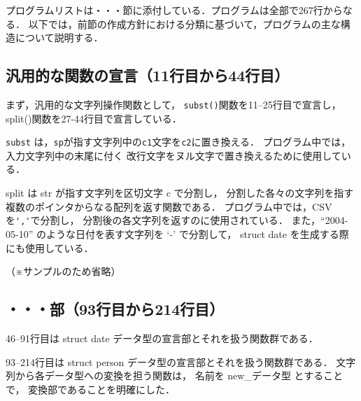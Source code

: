 \documentclass[a4j,11pt]{jarticle}
\begin{document}


プログラムリストは・・・節に添付している．プログラムは全部で267行からなる．
以下では，前節の作成方針における分類に基づいて，プログラムの主な構造について説明する．

\subsection{汎用的な関数の宣言（11行目から44行目）}

まず，汎用的な文字列操作関数として，
\verb|subst()|関数を11--25行目で宣言し， %
split()関数を27-44行目で宣言している．       %

\verb|subst| は，\verb|sp|が指す文字列中の\verb|c1|文字を\verb|c2|に置き換える．
プログラム中では，入力文字列中の末尾に付く
改行文字をヌル文字で置き換えるために使用している．

split は str が指す文字列を区切文字 c で分割し，
分割した各々の文字列を指す複数のポインタからなる配列を返す関数である．
プログラム中では，CSVを\verb|','|で分割し，
分割後の各文字列を返すのに使用されている．
また，``2004-05-10'' のような日付を表す文字列を `-' で分割して，
struct date を生成する際にも使用している．

（※サンプルのため省略）

\subsection{・・・部（93行目から214行目）}

46--91行目は struct date データ型の宣言部とそれを扱う関数群である．

93--214行目は struct person データ型の宣言部とそれを扱う関数群である．
文字列から各データ型への変換を担う関数は，
名前を new\_データ型 とすることで，
変換部であることを明確にした．
\end{document}
